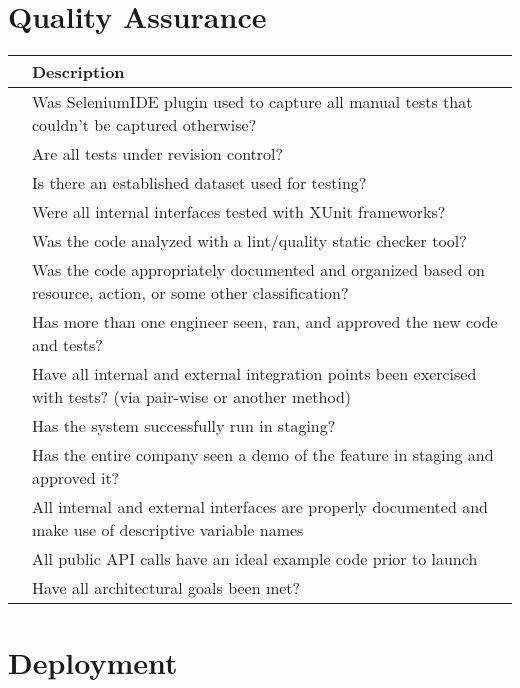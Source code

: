 \documentclass{article}
\begin{document}
\section{Quality Assurance}

\begin{center}
    \begin{tabular}{ | p{.25cm} || p{10cm} |}
    \hline
     & Description \\ \hline
     & Was SeleniumIDE plugin used to capture all manual tests that couldn't be captured otherwise? \\ \hline
     & Are all tests under revision control? \\ \hline
     & Is there an established dataset used for testing? \\ \hline
     & Were all internal interfaces tested with XUnit frameworks? \\ \hline
     & Was the code analyzed with a lint/quality static checker tool? \\ \hline
     & Was the code appropriately documented and organized based on resource, action, or some other classification? \\ \hline
     & Has more than one engineer seen, ran, and approved the new code and tests? \\ \hline
     & Have all internal and external integration points been exercised with tests? (via pair-wise or another method) \\ \hline
     & Has the system successfully run in staging? \\ \hline
     & Has the entire company seen a demo of the feature in staging and approved it? \\ \hline
     & All internal and external interfaces are properly documented and make use of descriptive variable names \\ \hline
     & All public API calls have an ideal example code prior to launch \\ \hline
     & Have all architectural goals been met? \\ \hline
    \end{tabular}
\end{center}



\section{Deployment}
\end{document}
